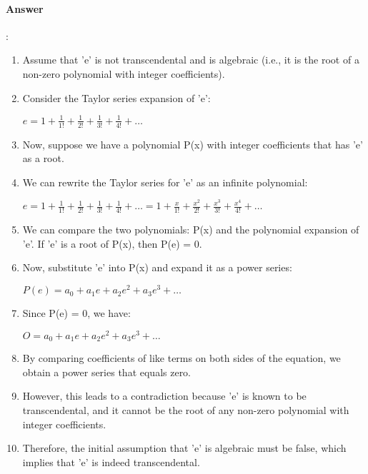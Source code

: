\documentclass{article}
\begin{document}
\paragraph{Answer}:
\begin{enumerate}
  \item Assume that 'e' is not transcendental and is algebraic (i.e., it is the root of a non-zero polynomial with integer coefficients).

  \item Consider the Taylor series expansion of 'e':
  
  $e = 1 + \frac{1}{1!} + \frac{1}{2!} + \frac{1}{3!} + \frac{1}{4!} + \ldots$
  
  \item Now, suppose we have a polynomial P(x) with integer coefficients that has 'e' as a root.
  
  \item We can rewrite the Taylor series for 'e' as an infinite polynomial:
  
  $e = 1 + \frac{1}{1!} + \frac{1}{2!} + \frac{1}{3!} + \frac{1}{4!} + \ldots = 1 + \frac{x}{1!} + \frac{x^2}{2!}+ \frac{x^3}{3!} + \frac{x^4}{4!} + \ldots$
  
  \item We can compare the two polynomials: P(x) and the polynomial expansion of 'e'. If 'e' is a root of P(x), then P(e) = 0.
  
  \item Now, substitute 'e' into P(x) and expand it as a power series:
  
  $P(e) = a_0 + a_1e + a_2e^2 + a_3e^3 + \ldots$
  
  \item Since P(e) = 0, we have:
  
  $O = a_0 + a_1e + a_2e^2 + a_3e^3 + \ldots$
  
  \item By comparing coefficients of like terms on both sides of the equation, we obtain a power series that equals zero.
  
  \item However, this leads to a contradiction because 'e' is known to be transcendental, and it cannot be the root of any non-zero polynomial with integer coefficients.
  
  \item Therefore, the initial assumption that 'e' is algebraic must be false, which implies that 'e' is indeed transcendental.
\end{enumerate}
\end{document}
